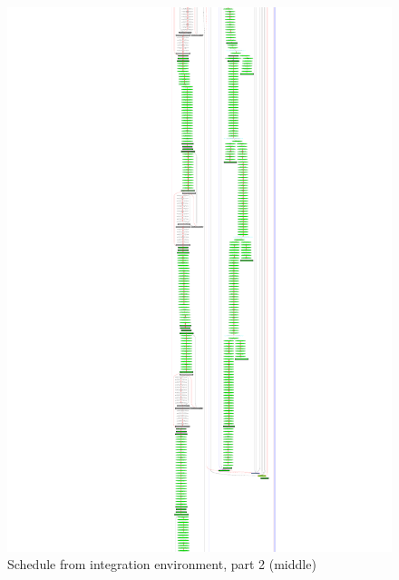\documentclass[12pt,a4paper]{report}
\begin{document}
    \begin{figure}
        \centering
        \includegraphics*[height=1.0\textheight,keepaspectratio]{tsl020-2.pdf}
        \caption{Schedule from integration environment, part 2 (middle)}
        \label{fig:tsl020-2}
    \end{figure}
\end{document}
